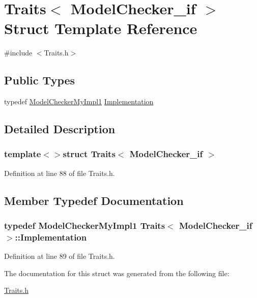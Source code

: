 \hypertarget{struct_traits_3_01_model_checker__if_01_4}{\section{Traits$<$ Model\-Checker\-\_\-if $>$ Struct Template Reference}
\label{struct_traits_3_01_model_checker__if_01_4}
}


{\ttfamily \#include $<$Traits.\-h$>$}

\subsection*{Public Types}
\begin{DoxyCompactItemize}
\item 
typedef \hyperlink{class_model_checker_my_impl1}{Model\-Checker\-My\-Impl1} \hyperlink{struct_traits_3_01_model_checker__if_01_4_aa969b0d5a3092d9a06c83185140de59b}{Implementation}
\end{DoxyCompactItemize}


\subsection{Detailed Description}
\subsubsection*{template$<$$>$struct Traits$<$ Model\-Checker\-\_\-if $>$}



Definition at line 88 of file Traits.\-h.



\subsection{Member Typedef Documentation}
\hypertarget{struct_traits_3_01_model_checker__if_01_4_aa969b0d5a3092d9a06c83185140de59b}{
\subsubsection[{Implementation}]{\setlength{\rightskip}{0pt plus 5cm}typedef {\bf Model\-Checker\-My\-Impl1} {\bf Traits}$<$ {\bf Model\-Checker\-\_\-if} $>$\-::{\bf Implementation}}}\label{struct_traits_3_01_model_checker__if_01_4_aa969b0d5a3092d9a06c83185140de59b}


Definition at line 89 of file Traits.\-h.



The documentation for this struct was generated from the following file\-:\begin{DoxyCompactItemize}
\item 
\hyperlink{_traits_8h}{Traits.\-h}\end{DoxyCompactItemize}

